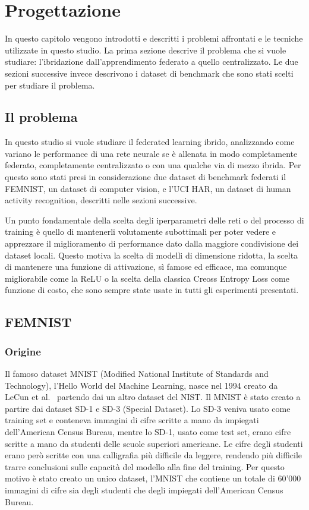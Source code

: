 \chapter{Progettazione}
In questo capitolo vengono introdotti e descritti i problemi affrontati 
e le tecniche utilizzate in questo studio. La prima sezione descrive 
il problema che si vuole studiare: l'ibridazione dall'apprendimento 
federato a quello centralizzato. Le due sezioni successive invece 
descrivono i dataset di benchmark che sono stati scelti per studiare 
il problema.


\section{Il problema}
In questo studio si vuole studiare il federated learning ibrido,
analizzando come variano le performance di una rete neurale se è 
allenata in modo completamente federato, completamente centralizzato 
o con una qualche via di mezzo ibrida. Per questo sono stati presi in
considerazione due dataset di benchmark federati il FEMNIST, 
un dataset di computer vision, e l'UCI HAR, un dataset di human activity
recognition, descritti nelle sezioni successive.

Un punto fondamentale della scelta degli iperparametri delle reti o 
del processo di training è quello di 
mantenerli volutamente subottimali per poter vedere e apprezzare il 
miglioramento di performance dato dalla maggiore condivisione dei 
dataset locali. Questo motiva la scelta di modelli di dimensione 
ridotta, la scelta di mantenere una funzione di attivazione, sì 
famose ed efficace, ma comunque migliorabile come la ReLU o la scelta 
della classica Creoss Entropy Loss come funzione di costo, che sono 
sempre state usate in tutti gli esperimenti presentati.


\section{FEMNIST}
\subsection{Origine}
Il famoso dataset MNIST (Modified National Institute of Standards and
Technology), l'Hello World del Machine Learning, nasce nel 1994 creato 
da LeCun et al.~\cite{lecun1998mnist} partendo dai un altro dataset 
del NIST.
Il MNIST è stato creato a partire dai dataset SD-1 e SD-3 (Special
Dataset). Lo SD-3 veniva usato come training set e conteneva immagini
di cifre scritte a mano da impiegati dell'American Census Bureau,
mentre lo SD-1, usato come test set, erano cifre scritte a mano da 
studenti delle scuole superiori americane. Le cifre degli studenti
erano però scritte con una calligrafia più difficile da leggere, rendendo più 
difficile trarre conclusioni sulle capacità del modello alla fine del
training. Per questo motivo è stato creato un unico dataset, l'MNIST 
che contiene un totale di 60'000 immagini di cifre sia degli studenti
che degli impiegati dell'American Census Bureau.


